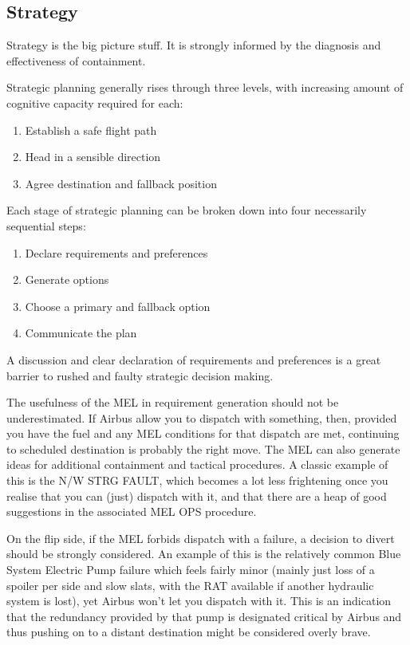 \documentclass[a5paper,11pt,titlepage]{article}
\begin{document}
\subsection{Strategy}

Strategy is the big picture stuff. It is strongly informed by the
diagnosis and effectiveness of containment.

Strategic planning generally rises through three levels, with increasing
amount of cognitive capacity required for each:

\begin{enumerate}
\item Establish a safe flight path
\item Head in a sensible direction
\item Agree destination and fallback position
\end{enumerate}

Each stage of strategic planning can be broken down into four
necessarily sequential steps:

\begin{enumerate}
\item Declare requirements and preferences
\item Generate options
\item Choose a primary and fallback option
\item Communicate the plan
\end{enumerate}

A discussion and clear declaration of requirements and preferences is a
great barrier to rushed and faulty strategic decision making.

The usefulness of the MEL in requirement generation should not be
underestimated. If Airbus allow you to dispatch with something, then,
provided you have the fuel and any MEL conditions for that dispatch are
met, continuing to scheduled destination is probably the right move. The
MEL can also generate ideas for additional containment and tactical
procedures. A classic example of this is the N/W STRG FAULT, which
becomes a lot less frightening once you realise that you can (just)
dispatch with it, and that there are a heap of good suggestions in
the associated MEL OPS procedure.

On the flip side, if the MEL forbids dispatch with a failure, a decision
to divert should be strongly considered. An example of this is the
relatively common Blue System Electric Pump failure which feels fairly
minor (mainly just loss of a spoiler per side and slow slats, with the
RAT available if another hydraulic system is lost), yet Airbus won't let
you dispatch with it. This is an indication that the redundancy provided
by that pump is designated critical by Airbus and thus pushing on to
a distant destination might be considered overly brave.
\end{document}
